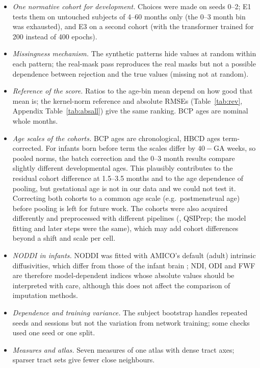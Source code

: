 \documentclass[11pt]{article}
\begin{document}
\begin{itemize}
\item \emph{One normative cohort for development.} Choices were made on seeds 0--2; E1 tests them on untouched subjects
of 4--60 months only (the 0--3 month bin was exhausted), and E3 on a second cohort (with the transformer trained for 200 instead of 400 epochs).
\item \emph{Missingness mechanism.} The synthetic patterns hide values at random within each pattern; the real-mask pass
reproduces the real masks but not a possible dependence between rejection and the true values (missing not at random).
\item \emph{Reference of the score.} Ratios to the age-bin mean depend on how good that mean is; the kernel-norm
reference and absolute RMSEs (Table~\ref{tab:rev}, Appendix Table~\ref{tab:absall}) give the same ranking. BCP ages are
nominal whole months.
\item \emph{Age scales of the cohorts.} BCP ages are chronological, HBCD ages term-corrected. For infants born before term
the scales differ by $40-\text{GA}$ weeks, so pooled norms, the batch correction and the 0--3 month results compare
slightly different developmental ages. This plausibly contributes to the residual cohort difference at 1.5--3.5 months and
to the age dependence of pooling, but gestational age is not in our data and we could not test it. Correcting both cohorts
to a common age scale (e.g.\ postmenstrual age) before pooling is left for future work. The cohorts were also acquired differently and preprocessed with different pipelines (, QSIPrep;
the model fitting and later steps were the same), which may add cohort differences beyond a shift and scale per cell.
\item \emph{NODDI in infants.} NODDI was fitted with AMICO's default (adult) intrinsic diffusivities, which differ from
those of the infant brain \citep{cieslak2025hbcd}; NDI, ODI and FWF are therefore model-dependent indices whose absolute
values should be interpreted with care, although this does not affect the comparison of imputation methods.
\item \emph{Dependence and training variance.} The subject bootstrap handles repeated seeds and sessions but not the
variation from network training; some checks used one seed or one split.
\item \emph{Measures and atlas.} Seven measures of one atlas with dense tract axes; sparser tract sets give fewer close
neighbours.
\end{itemize}
\end{document}
